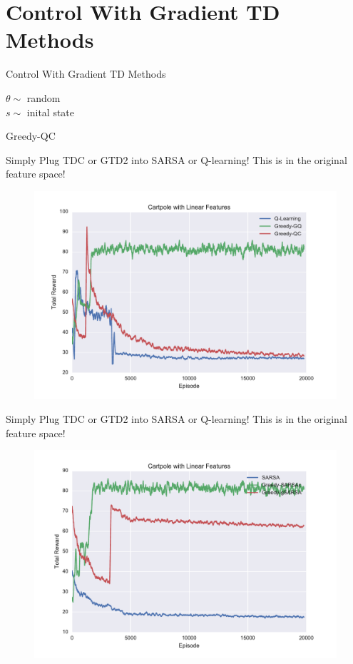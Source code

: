\documentclass{beamer}
\begin{document}
\section{Control With Gradient TD Methods}
\begin{frame}{Control With Gradient TD Methods}
 \begin{algorithm}[H]
    $\theta \sim$ random\\
    $s \sim$ inital state
 \caption{Greedy-QC}
\end{algorithm}
\end{frame}
\begin{frame}{Simply Plug TDC or GTD2 into SARSA or Q-learning!}
This is in the original feature space!
  \begin{figure}
    \includegraphics[width=0.7\linewidth]{LinearCartPole-GQ.pdf}
  \end{figure}
\end{frame}
\begin{frame}{Simply Plug TDC or GTD2 into SARSA or Q-learning!}
This is in the original feature space!
  \begin{figure}
    \includegraphics[width=0.7\linewidth]{LinearCartPole-GSarsa.pdf}
  \end{figure}
\end{frame}
\end{document}
